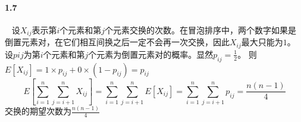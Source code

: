 \paragraph{1.7}~{}
设$X_{ij}$表示第$i$个元素和第$j$个元素交换的次数。在冒泡排序中，两个数字如果是倒置元素对，在它们相互间换之后一定不会再一次交换，因此$X_{ij}$最大只能为$1$。
设$p{ij}$为第$i$个元素和第$j$个元素为倒置元素对的概率。显然$p_{ij}=\frac{1}{2}$。
则$E[X_{ij}]=1 \times p_{ij}+0 \times (1-p_{ij}) = p_{ij}$
$$E[\sum_{i=1}^{n}\sum_{j=i+1}^{n}X_{ij}] = \sum_{i=1}^{n}\sum_{j=i+1}^{n}E[X_{ij}] = \sum_{i=1}^{n}\sum_{j=i+1}^{n}p_{ij}=\frac{n(n-1)}{4}$$
交换的期望次数为$\frac{n(n-1)}{4}$